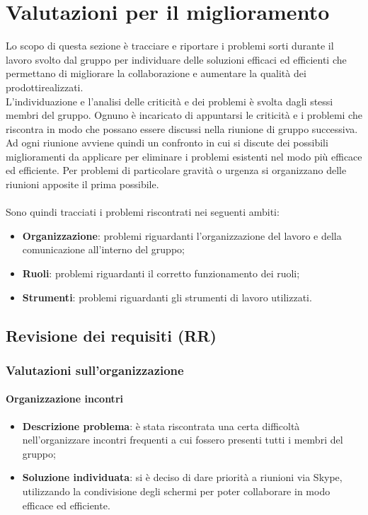 \section{Valutazioni per il miglioramento} 
Lo scopo di questa sezione è tracciare e riportare i problemi sorti durante il lavoro svolto dal gruppo per individuare delle soluzioni efficaci ed efficienti che permettano di migliorare la collaborazione e aumentare la qualità dei prodotti\glosp realizzati.
\\L'individuazione e l'analisi delle criticità e dei problemi è svolta dagli stessi membri del gruppo. Ognuno è incaricato di appuntarsi le criticità e i problemi che riscontra in modo che possano essere discussi nella riunione di gruppo successiva. Ad ogni riunione avviene quindi un confronto in cui si discute dei possibili miglioramenti da applicare per eliminare i problemi esistenti nel modo più efficace ed efficiente. Per problemi di particolare gravità o urgenza si organizzano delle riunioni apposite il prima possibile.
\\ \\Sono quindi tracciati i problemi riscontrati nei seguenti ambiti:

\begin{itemize}
	\item \textbf{Organizzazione}: problemi riguardanti l'organizzazione del lavoro e della comunicazione all'interno del gruppo;
	\item \textbf{Ruoli}: problemi riguardanti il corretto funzionamento dei ruoli;
	\item \textbf{Strumenti}: problemi riguardanti gli strumenti di lavoro utilizzati.
\end{itemize}
\subsection{Revisione dei requisiti (RR)}
	\subsubsection{Valutazioni sull'organizzazione}
		\paragraph{Organizzazione incontri}
			\begin{itemize}
				\item \textbf{Descrizione problema}: è stata riscontrata una certa difficoltà nell'organizzare incontri frequenti a cui fossero presenti tutti i membri del gruppo;
				\item \textbf{Soluzione individuata}: si è deciso di dare priorità a riunioni via Skype, utilizzando la condivisione degli schermi per poter collaborare in modo efficace ed efficiente.
			\end{itemize}
